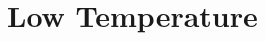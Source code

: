 \documentclass [PhD,nolistoftables,scheader] {uclathes}
\begin{document}
%	
%	
%	

\chapter{Low Temperature } \label{sec: [HCO]}

	
%	
%		
%	
%		
%		
%		
%		
%		
%			
%	
%			
%			
%	
\end{document}
